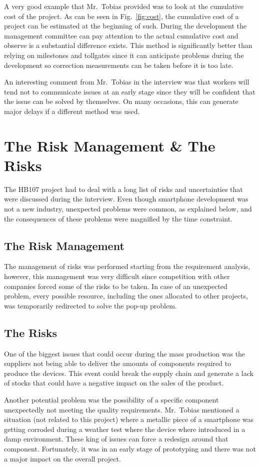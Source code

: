 \documentclass[conference]{IEEEtran}
\begin{document}
A very good example that Mr.~Tobias provided was to look at the cumulative cost of the project. As can be seen in Fig.~\ref{fig:cost}, the cumulative cost of a project can be estimated at the beginning of such. During the development the management committee can pay attention to the actual cumulative cost and observe is a substantial difference exists. This method is significantly better than relying on milestones and tollgates since it can anticipate problems during the development so correction measurements can be taken before it is too late.

An interesting comment from Mr.~Tobias in the interview was that workers will tend not to communicate issues at an early stage since they will be confident that the issue can be solved by themselves. On many occasions, this can generate major delays if a different method was used.

\section{The Risk Management \& The Risks}
The HB107 project had to deal with a long list of risks and uncertainties that were discussed during the interview. Even though smartphone development was not a new industry, unexpected problems were common, as explained below, and the consequences of these problems were magnified by the time constraint. 

\subsection{The Risk Management}
The management of risks was performed starting from the requirement analysis, however, this management was very difficult since competition with other companies forced some of the risks to be taken. In case of an unexpected problem, every possible resource, including the ones allocated to other projects, was temporarily redirected to solve the pop-up problem.

\subsection{The Risks}
One of the biggest issues that could occur during the mass production was the suppliers not being able to deliver the amounts of components required to produce the devices. This event could break the supply chain and generate a lack of stocks that could have a negative impact on the sales of the product.

Another potential problem was the possibility of a specific component unexpectedly not meeting the quality requirements. Mr.~Tobias mentioned a situation (not related to this project) where a metallic piece of a smartphone was getting corroded during a weather test where the device where introduced in a damp environment. These king of issues can force a redesign around that component. Fortunately, it was in an early stage of prototyping and there was not a major impact on the overall project.
\end{document}
